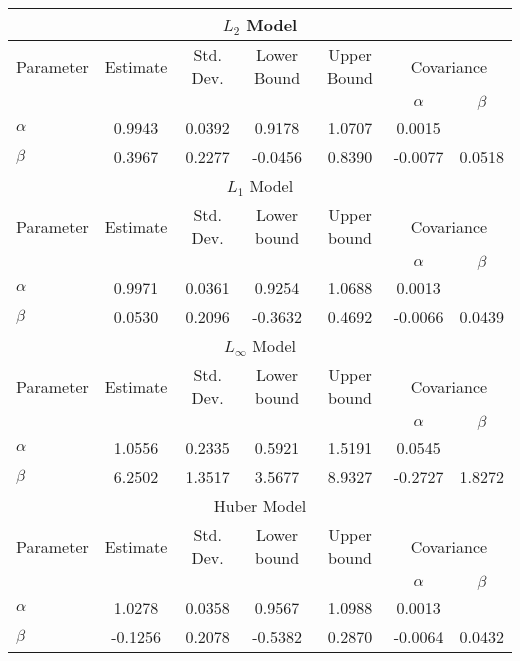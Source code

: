 \begin{tabular}{l|cccc|cc} \hline \hline 
\multicolumn{7}{c}{$L_2$ Model} \\ \hline \hline
Parameter & Estimate & Std. Dev. & Lower Bound & Upper Bound & \multicolumn{2}{c}{Covariance}  \\& & & & & $\alpha$ & $\beta$ \\ \hline 
$\alpha$ & 0.9943 & 0.0392 & 0.9178 & 1.0707 & 0.0015 & \\ 
$\beta$ & 0.3967 & 0.2277 & -0.0456 & 0.8390 & -0.0077 & 0.0518 \\ 
\hline \hline 
\multicolumn{7}{c}{$L_1$ Model} \\ \hline \hline
Parameter & Estimate & Std. Dev. & Lower bound & Upper bound & \multicolumn{2}{c}{Covariance}  \\& & & & & $\alpha$ & $\beta$ \\ \hline 
$\alpha$ & 0.9971 & 0.0361 & 0.9254 & 1.0688 & 0.0013 & \\ 
$\beta$ & 0.0530 & 0.2096 & -0.3632 & 0.4692 & -0.0066 & 0.0439 \\ 
\hline \hline 
\multicolumn{7}{c}{$L_\infty$ Model} \\ \hline \hline
Parameter & Estimate & Std. Dev. & Lower bound & Upper bound & \multicolumn{2}{c}{Covariance}  \\& & & & & $\alpha$ & $\beta$ \\ \hline 
$\alpha$ & 1.0556 & 0.2335 & 0.5921 & 1.5191 & 0.0545 & \\ 
$\beta$ & 6.2502 & 1.3517 & 3.5677 & 8.9327 & -0.2727 & 1.8272 \\ 
\hline \hline 
\multicolumn{7}{c}{Huber Model} \\ \hline \hline
Parameter & Estimate & Std. Dev. & Lower bound & Upper bound & \multicolumn{2}{c}{Covariance}  \\& & & & & $\alpha$ & $\beta$ \\ \hline 
$\alpha$ & 1.0278 & 0.0358 & 0.9567 & 1.0988 & 0.0013 \\ 
$\beta$ & -0.1256 & 0.2078 & -0.5382 & 0.2870 & -0.0064 & 0.0432 \\ 
\hline \hline
\end{tabular} 